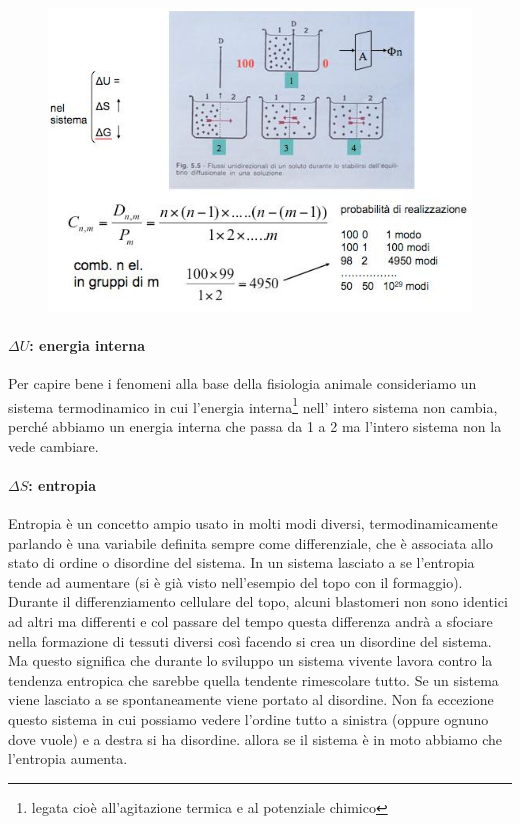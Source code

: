 \documentclass[a4paper,12pt]{article}
\begin{document}
\begin{figure}[H]
\centering
\includegraphics[scale=0.4]{immagine/combinatorio.jpg}
\caption{}
\end{figure}


\paragraph{$\Delta U$: energia interna}
Per capire bene i fenomeni alla base della fisiologia animale consideriamo un sistema termodinamico in cui l'energia interna\footnote{legata cioè all'agitazione termica e al potenziale chimico} nell' intero sistema non cambia, perché abbiamo un energia interna che passa da 1 a 2 ma l'intero sistema non la vede cambiare.

\paragraph{$\Delta S$: entropia}
Entropia è un concetto ampio usato in molti modi diversi, termodinamicamente parlando è una variabile definita sempre come differenziale, che è associata allo stato di ordine o disordine del sistema.
In un sistema lasciato a se l'entropia tende ad aumentare (si è già visto nell'esempio del topo con il formaggio).
Durante il differenziamento cellulare del topo, alcuni blastomeri non sono identici ad altri ma differenti e col passare del tempo questa differenza andrà a sfociare nella formazione di  tessuti diversi così facendo si crea un disordine del sistema. Ma questo significa che durante lo sviluppo un sistema vivente lavora contro la tendenza entropica che sarebbe quella tendente rimescolare tutto.
Se un sistema viene lasciato a se spontaneamente viene portato al disordine.
Non fa eccezione questo sistema in cui possiamo vedere l'ordine tutto a sinistra (oppure ognuno dove vuole) e a destra si ha disordine. allora se il sistema è in moto abbiamo che l'entropia aumenta.
\end{document}
